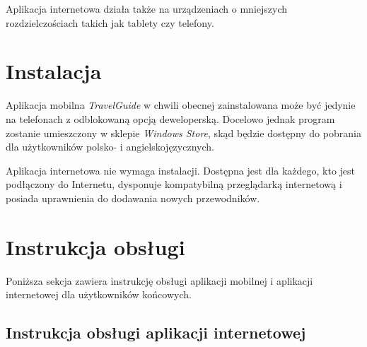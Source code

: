 \documentclass[a4paper]{book}
\newcommand{\appName}{\emph{TravelGuide} }
\begin{document}
		Aplikacja internetowa działa także na urządzeniach o mniejszych rozdzielczościach takich jak tablety czy telefony.
		
		\section{Instalacja}
		\label{id:sec:instalacja}
		Aplikacja mobilna \appName w chwili obecnej zainstalowana może być jedynie na telefonach z odblokowaną opcją deweloperską. Docelowo jednak program zostanie umieszczony w sklepie \emph{Windows Store}, skąd będzie dostępny do pobrania dla użytkowników polsko- i angielskojęzycznych. 
		
		Aplikacja internetowa nie wymaga instalacji. Dostępna jest dla każdego, kto jest podłączony do Internetu, dysponuje kompatybilną przeglądarką internetową i posiada uprawnienia do dodawania nowych przewodników. 
	
	
		\section{Instrukcja obsługi}
		\label{id:sec:instrukcja_obslugi}
		Poniższa sekcja zawiera instrukcję obsługi aplikacji mobilnej i aplikacji internetowej dla użytkowników końcowych. 
		
		\subsection{Instrukcja obsługi aplikacji internetowej}	
		
\end{document}

